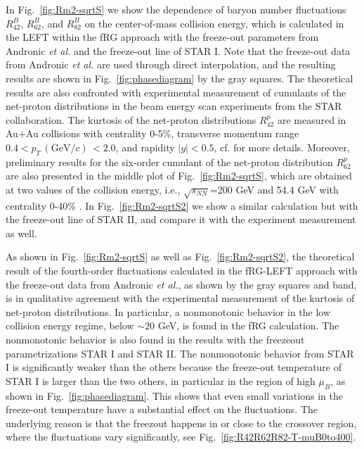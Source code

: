 \documentclass[%
reprint,
superscriptaddress,
showpacs,preprintnumbers,
amsmath,amssymb,
aps,
prd,
]{revtex4-1}
\def\Fig#1{Fig.~\ref{#1}} \def\Tab#1{Tab.~\ref{#1}}
\begin{document}
In \Fig{fig:Rm2-sqrtS} we show the dependence of baryon number fluctuations $R^{B}_{42}$, $R^{B}_{62}$, and $R^{B}_{82}$ on the center-of-mass collision energy, which is calculated in the LEFT within the fRG approach with the freeze-out parameters from Andronic {\it et al.} \cite{Andronic:2017pug} and the freeze-out line of STAR I. Note that the freeze-out data from Andronic {\it et al.} are used through direct interpolation, and the resulting results are shown in \Fig{fig:phasediagram} by the gray squares. The theoretical results are also confronted with experimental measurement of cumulants of the net-proton distributions in the beam energy scan experiments from the STAR collaboration. The kurtosis of the net-proton distributions $R^{p}_{42}$ are measured in Au+Au collisions with centrality 0-5\%, transverse momentum range $0.4< p_T\,(\mathrm{GeV}/c)\,<2.0$, and rapidity $|y|<0.5$, cf. \cite{Adam:2020unf} for more details. Moreover, preliminary results for the six-order cumulant of the net-proton distribution $R^{p}_{62}$ are also presented in the middle plot of \Fig{fig:Rm2-sqrtS}, which are obtained at two values of the collision energy, i.e., $\sqrt{s_{NN}}$=200 GeV and 54.4 GeV with centrality 0-40\% \cite{Nonaka:2020crv,Pandav:2020uzx}. In \Fig{fig:Rm2-sqrtS2} we show a similar calculation but with the freeze-out line of STAR II, and compare it with the experiment measurement as well.
	
As shown in \Fig{fig:Rm2-sqrtS} as well as \Fig{fig:Rm2-sqrtS2}, the theoretical result of the fourth-order fluctuations calculated in the fRG-LEFT approach with the freeze-out data from Andronic {\it et al.}, as shown by the gray squares and band, is in qualitative agreement with the experimental measurement of the kurtosis of net-proton distributions.  In particular, a nonmonotonic behavior in the low collision energy regime, below $\sim 20$ GeV, is found in the fRG calculation. The nonmonotonic behavior is also found in the results with the freezeout parametrizations STAR I and STAR II. The nonmonotonic behavior from STAR I is significantly weaker than the others because the freeze-out temperature of STAR I is larger than the two others, in particular in the region of high $\mu_B$, as shown in \Fig{fig:phasediagram}. This shows that even small variations in the freeze-out temperature have a substantial effect on the fluctuations. The underlying reason is that the freezout happens in or close to the crossover region, where the fluctuations vary significantly, see \Fig{fig:R42R62R82-T-muB0to400}.
	
\end{document}
